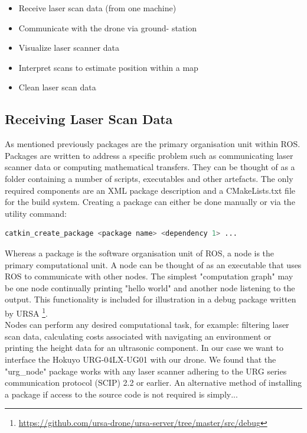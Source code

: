 \documentclass[capstone_report.tex]{subfiles}
\begin{document}
\begin{itemize}
    \item Receive laser scan data (from one machine)
    \item Communicate with the drone via ground- station
    \item Visualize laser scanner data
    \item Interpret scans to estimate position within a map
    \item Clean laser scan data
\end{itemize}

\subsection{Receiving Laser Scan Data}
As mentioned previously packages are the primary organisation unit within ROS.  Packages are written to address a specific problem such as communicating laser scanner data or computing mathematical transfers.  They can be thought of as a folder containing a number of scripts, executables and other artefacts. The only required components are an XML package description and a CMakeLists.txt file for the build system.  Creating a package can either be done manually or via the utility command:

\begin{lstlisting}[language=bash]
    catkin_create_package <package name> <dependency 1> ...
\end{lstlisting}

Whereas a package is the software organisation unit of ROS, a node is the primary computational unit.  A node can be thought of as an executable that uses ROS to communicate with other nodes.  The simplest "computation graph" may be one node continually printing "hello world" and another node listening to the output.  This functionality is included for illustration in a debug package written by URSA \footnote{\url{https://github.com/ursa-drone/ursa-server/tree/master/src/debug}}.\\

  Nodes can perform any desired computational task, for example: filtering laser scan data, calculating costs associated with navigating an environment or printing the height data for an ultrasonic component.  In our case we want to interface the Hokuyo URG-04LX-UG01 with our drone.  We found that the "urg\_node" package works with any laser scanner adhering to the URG series communication protocol (SCIP) 2.2 or earlier.  An alternative method of installing a package if access to the source code is not required is simply$...$
\end{document}
